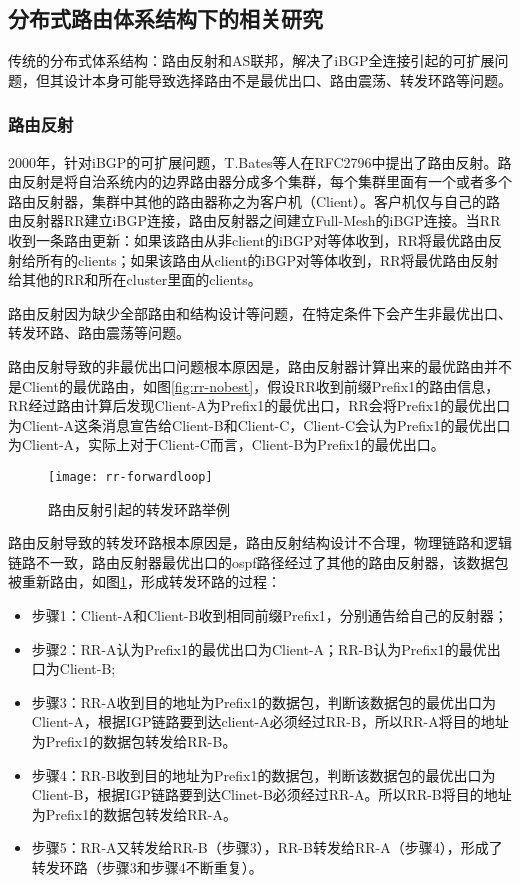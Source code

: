 \subsection{分布式路由体系结构下的相关研究}
传统的分布式体系结构：路由反射和AS联邦，解决了iBGP全连接引起的可扩展问题，但其设计本身可能导致选择路由不是最优出口、路由震荡、转发环路等问题。

\subsubsection{路由反射\cite{rfc2796}}

2000年，针对iBGP的可扩展问题，T.Bates等人在RFC2796\cite{rfc2796}中提出了路由反射。路由反射是将自治系统内的边界路由器分成多个集群，每个集群里面有一个或者多个路由反射器，集群中其他的路由器称之为客户机（Client）。客户机仅与自己的路由反射器RR建立iBGP连接，路由反射器之间建立Full-Mesh的iBGP连接。当RR收到一条路由更新：如果该路由从非client的iBGP对等体收到，RR将最优路由反射给所有的clients；如果该路由从client的iBGP对等体收到，RR将最优路由反射给其他的RR和所在cluster里面的clients。



路由反射因为缺少全部路由和结构设计等问题，在特定条件下会产生非最优出口、转发环路、路由震荡等问题。


路由反射导致的非最优出口问题根本原因是，路由反射器计算出来的最优路由并不是Client的最优路由，如图\ref{fig:rr-nobest}，假设RR收到前缀Prefix1的路由信息，RR经过路由计算后发现Client-A为Prefix1的最优出口，RR会将Prefix1的最优出口为Client-A这条消息宣告给Client-B和Client-C，Client-C会认为Prefix1的最优出口为Client-A，实际上对于Client-C而言，Client-B为Prefix1的最优出口。

\begin{figure}
  \centering
  \texttt{[image: rr-forwardloop]}
  \caption{路由反射引起的转发环路举例\cite{ibgp2016infocom}}
  \label{fig:rr-forwardloop}
\end{figure}



路由反射导致的转发环路根本原因是，路由反射结构设计不合理，物理链路和逻辑链路不一致，路由反射器最优出口的ospf路径经过了其他的路由反射器，该数据包被重新路由，如图\ref{fig:rr-forwardloop}，形成转发环路的过程：

\begin{itemize}
\item 步骤1：Client-A和Client-B收到相同前缀Prefix1，分别通告给自己的反射器；
\item 步骤2：RR-A认为Prefix1的最优出口为Client-A；RR-B认为Prefix1的最优出口为Client-B;
\item 步骤3：RR-A收到目的地址为Prefix1的数据包，判断该数据包的最优出口为Client-A，根据IGP链路要到达client-A必须经过RR-B，所以RR-A将目的地址为Prefix1的数据包转发给RR-B。
\item 步骤4：RR-B收到目的地址为Prefix1的数据包，判断该数据包的最优出口为Client-B，根据IGP链路要到达Clinet-B必须经过RR-A。所以RR-B将目的地址为Prefix1的数据包转发给RR-A。
\item 步骤5：RR-A又转发给RR-B（步骤3），RR-B转发给RR-A（步骤4），形成了转发环路（步骤3和步骤4不断重复）。
\end{itemize}



